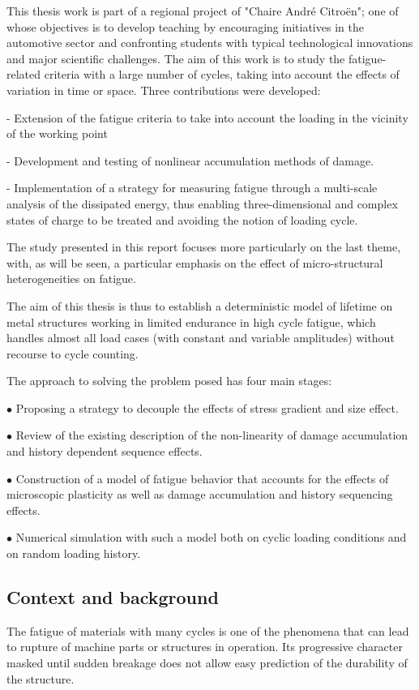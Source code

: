 This thesis work is part of a regional project of "Chaire André Citroën"; one of whose objectives is to develop teaching by encouraging initiatives in the automotive sector and confronting students with typical technological innovations and major scientific challenges. The aim of this work is to study the fatigue-related criteria with a large number of cycles, taking into account the effects of variation in time or space. Three contributions were developed:

- Extension of the fatigue criteria to take into account the loading in the vicinity of the working point

- Development and testing of nonlinear accumulation methods of damage.

- Implementation of a strategy for measuring fatigue through a multi-scale analysis of the dissipated energy, thus enabling three-dimensional and complex states of charge to be treated and avoiding the notion of loading cycle.

The study presented in this report focuses more particularly on the last theme, with, as will be seen, a particular emphasis on the effect of micro-structural heterogeneities on fatigue.

The aim of this thesis is thus to establish a deterministic model of lifetime
on metal structures working in limited endurance in high cycle fatigue, which handles almost all load cases
(with constant and variable amplitudes) without recourse to cycle counting.

The approach to solving the problem posed has four main stages:

$\bullet$ Proposing a strategy to decouple the effects of stress gradient and size effect.

$\bullet$ Review of the existing description of the non-linearity of damage accumulation and history dependent sequence effects.

$\bullet$ Construction of a model of fatigue behavior that accounts for the effects of
microscopic plasticity as well as damage accumulation and history sequencing effects. 

$\bullet$ Numerical simulation with such a model both on cyclic loading conditions and on random loading history.




\subsection{Context and background}
The fatigue of materials with many cycles is one of the phenomena that can lead to
rupture of machine parts or structures in operation. Its progressive character
masked until sudden breakage does not allow easy prediction of the durability of the
structure.

